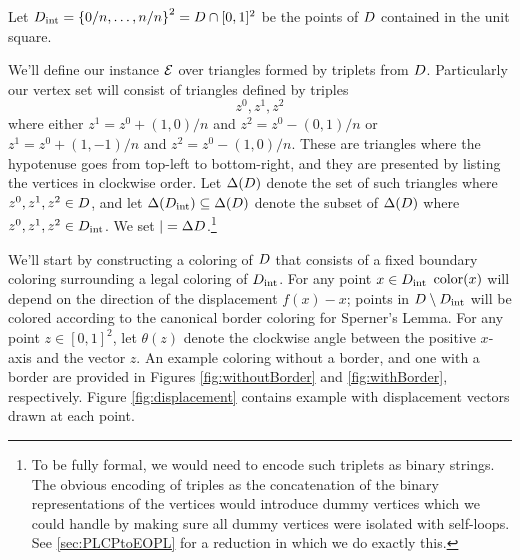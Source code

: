 Let $D_{\mathrm{int}} = \left\{ 0/n,\dotsc,n/n \right\}^2 = D\cap [0,1]^2$ be the points of $D$ contained in the unit square.

We'll define our \EOPL instance $\mbox{${\mathcal E}$}$ over triangles formed by triplets from $D$.  Particularly our vertex set will consist of triangles defined by triples
  \[z^0,z^1,z^2\] where either $z^1 = z^0 + (1,0)/n$ and $z^2 = z^0 - (0, 1)/n$ or $z^1 = z^0 + (1,-1)/n$ and $z^2 = z^0 - (1,0)/n$. These are triangles where the hypotenuse goes from top-left to bottom-right, and they are presented by listing the vertices in clockwise order. Let $\Delta(D)$ denote the set of such triangles where $z^0,z^1,z^2 \in D$, and let $\Delta(D_{\mathrm{int}}) \subseteq \Delta(D)$ denote the subset of $\Delta(D)$ where $z^0,z^1,z^2 \in D_{\mathrm{int}}$. We set $\vert = \Delta{D}$.\footnote{To be fully formal, we would need to encode such triplets as binary strings. The obvious encoding of triples as the concatenation of the binary representations of the vertices would introduce dummy vertices which we could handle by making sure all dummy vertices were isolated with self-loops. See \ref{sec:PLCPtoEOPL} for a reduction in which we do exactly this.}

  We'll start by constructing a coloring of $D$ that consists of a fixed boundary coloring surrounding a legal coloring of $D_{\mathrm{int}}$. For any point $x \in D_{\mathrm{int}}$ $\operatorname{color}(x)$ will depend on the direction of the displacement $f(x) - x$; points in $D\setminus D_{\mathrm{int}}$ will be colored according to the canonical border coloring for Sperner's Lemma. For any point $z \in [0,1]^2$, let $\theta(z)$ denote the clockwise angle between the positive $x$-axis and the vector $z$. An example coloring without a border, and one with a border are provided in Figures \ref{fig:withoutBorder} and \ref{fig:withBorder}, respectively. Figure \ref{fig:displacement} contains example with displacement vectors drawn at each point.

